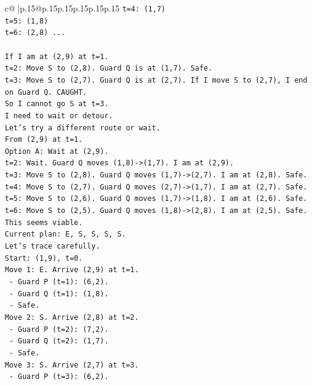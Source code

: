 \documentclass{article}
\begin{document}
{\begin{supertabular}{c@{$\;$}|p{.15\linewidth}@{}p{.15\linewidth}p{.15\linewidth}p{.15\linewidth}p{.15\linewidth}p{.15\linewidth}}
{{{\texttt{t=4: (1,7)} \\
\texttt{t=5: (1,8)} \\
\texttt{t=6: (2,8) ...} \\
\\ 
\texttt{If I am at (2,9) at t=1.} \\
\texttt{t=2: Move S to (2,8). Guard Q is at (1,7). Safe.} \\
\texttt{t=3: Move S to (2,7). Guard Q is at (2,7). If I move S to (2,7), I end on Guard Q. CAUGHT.} \\
\texttt{So I cannot go S at t=3.} \\
\texttt{I need to wait or detour.} \\
\texttt{Let's try a different route or wait.} \\
\texttt{From (2,9) at t=1.} \\
\texttt{Option A: Wait at (2,9).} \\
\texttt{t=2: Wait. Guard Q moves (1,8){-}>(1,7). I am at (2,9).} \\
\texttt{t=3: Move S to (2,8). Guard Q moves (1,7){-}>(2,7). I am at (2,8). Safe.} \\
\texttt{t=4: Move S to (2,7). Guard Q moves (2,7){-}>(1,7). I am at (2,7). Safe.} \\
\texttt{t=5: Move S to (2,6). Guard Q moves (1,7){-}>(1,8). I am at (2,6). Safe.} \\
\texttt{t=6: Move S to (2,5). Guard Q moves (1,8){-}>(2,8). I am at (2,5). Safe.} \\
\texttt{This seems viable.} \\
\texttt{Current plan: E, S, S, S, S.} \\
\texttt{Let's trace carefully.} \\
\texttt{Start: (1,9), t=0.} \\
\texttt{Move 1: E. Arrive (2,9) at t=1.} \\
\texttt{  {-} Guard P (t=1): (6,2).} \\
\texttt{  {-} Guard Q (t=1): (1,8).} \\
\texttt{  {-} Safe.} \\
\texttt{Move 2: S. Arrive (2,8) at t=2.} \\
\texttt{  {-} Guard P (t=2): (7,2).} \\
\texttt{  {-} Guard Q (t=2): (1,7).} \\
\texttt{  {-} Safe.} \\
\texttt{Move 3: S. Arrive (2,7) at t=3.} \\
\texttt{  {-} Guard P (t=3): (6,2).} \\
}}}
\end{supertabular}}
\end{document}
